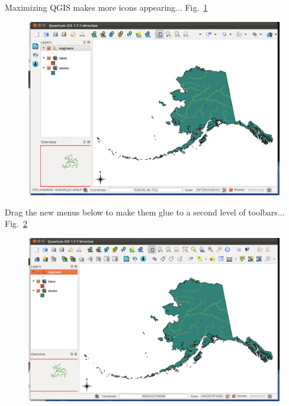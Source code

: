 Maximizing QGIS makes more icons appearing... Fig.~\ref{fig:qgis012}

\begin{figure}[htbp]
   \centering
   \includegraphics[scale=0.3]{qgis012.png}
   \caption{}
   \label{fig:qgis012}
\end{figure}


Drag the new menus below to make them glue to a second level of
toolbars... Fig.~\ref{fig:qgis013}

\begin{figure}[htbp]
   \centering
   \includegraphics[scale=0.3]{qgis013.png}
   \caption{}
   \label{fig:qgis013}
\end{figure}

